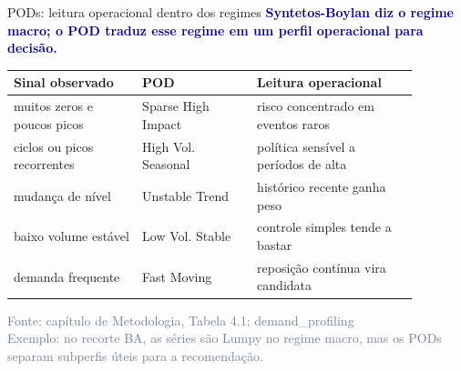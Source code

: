 \begin{frame}{PODs: leitura operacional dentro dos regimes}
  \scriptsize\textbf{\textcolor{darkblue}{Syntetos-Boylan diz o regime macro; o POD traduz esse regime em um perfil operacional para decisão.}}
  \vspace{0.25em}

  \centering
  \renewcommand{\arraystretch}{1.08}
  \setlength{\tabcolsep}{3pt}
  \scriptsize
  \begin{tabular}{@{}p{0.28\linewidth}p{0.25\linewidth}p{0.35\linewidth}@{}}
    \toprule
    \textbf{Sinal observado} & \textbf{POD} & \textbf{Leitura operacional} \\
    \midrule
    muitos zeros e poucos picos & Sparse High Impact & risco concentrado em eventos raros \\
    ciclos ou picos recorrentes & High Vol. Seasonal & política sensível a períodos de alta \\
    mudança de nível & Unstable Trend & histórico recente ganha peso \\
    baixo volume estável & Low Vol. Stable & controle simples tende a bastar \\
    demanda frequente & Fast Moving & reposição contínua vira candidata \\
    \bottomrule
  \end{tabular}
  \vspace{0.08em}

  {\tiny\textcolor{slategray}{Fonte: capítulo de Metodologia, Tabela 4.1; demand\_profiling}}\\[-0.08em]
  {\tiny\textcolor{slategray}{Exemplo: no recorte BA, as séries são Lumpy no regime macro, mas os PODs separam subperfis úteis para a recomendação.}}
\end{frame}
